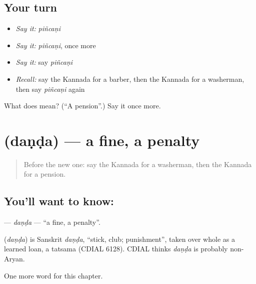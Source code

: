 \subsection*{Your turn}
\begin{itemize}
\raggedright
  \item \emph{Say it:} \emph{piñcaṇi}
  \item \emph{Say it:} \emph{piñcaṇi}, once more
  \item \emph{Say it:} say \emph{piñcaṇi}
  \item \emph{Recall:} say the Kannada for a barber, then the Kannada for a washerman, then say \emph{piñcaṇi} again
\end{itemize}

\begin{tcolorbox}[breakable,colback=teal!4,colframe=teal!35!black,title={Before you move on}]
What does  mean? (\textquotedblleft{}A pension\textquotedblright{}.) Say it once more.
\end{tcolorbox}
\section[\texorpdfstring{\kn{ದಂಡ} (daṇḍa)}{ದಂಡ (daṇḍa)}]{ (daṇḍa) — a fine, a penalty}

\label{lesson:KA-C271-danda}



\begin{quote}
Before the new one: say the Kannada for a washerman, then the Kannada for a pension.
\end{quote}

\subsection*{You'll want to know: }
\textbf{} — \emph{daṇḍa} — \textquotedblleft{}a fine, a penalty\textquotedblright{}.

\begin{cousinweb}
\textbf{} (\emph{daṇḍa}) is Sanskrit \emph{daṇḍa}, \textquotedblleft{}stick, club; punishment\textquotedblright{}, taken over whole as a learned loan, a tatsama (CDIAL 6128). CDIAL thinks \emph{daṇḍa} is probably non-Aryan.
\end{cousinweb}

\begin{grammarlens}[title={What you've built}]
One more word for this chapter.
\end{grammarlens}

